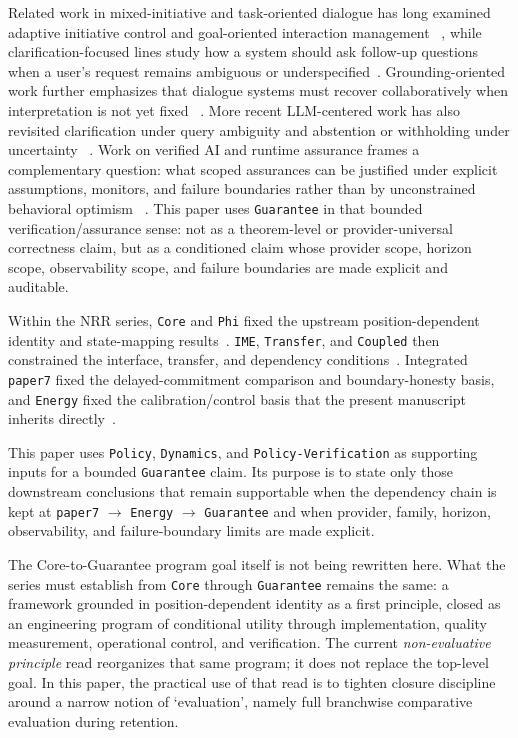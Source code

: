 \documentclass[11pt]{article}
\renewcommand{\_}{\textunderscore\hspace{0pt}}
\begin{document}
Related work in mixed-initiative and task-oriented dialogue has long examined
adaptive initiative control and goal-oriented interaction management
~\cite{chucarroll2000mimic,wen2017taskdialogue}, while clarification-focused lines
study how a system should ask follow-up questions when a user's request remains
ambiguous or underspecified~\cite{deboni2003clarification,rao2018evpi,hu2020interactive}. Grounding-oriented work further emphasizes that dialogue systems
must recover collaboratively when interpretation is not yet fixed
~\cite{benotti2021groundedclarifications,benotti2021grounding}. More recent
LLM-centered work has also revisited clarification under query ambiguity and
abstention or withholding under uncertainty
~\cite{sahay-etal-2025-ask,wen-etal-2025-know,madhusudhan-etal-2025-llms}.
Work on verified AI and runtime assurance frames a complementary question:
what scoped assurances can be justified under explicit assumptions, monitors,
and failure boundaries rather than by unconstrained behavioral optimism
~\cite{seshia2022verifiedai,desai2019soter}. This paper uses
\texttt{Guarantee} in that bounded verification/assurance sense: not as a
theorem-level or provider-universal correctness claim, but as a conditioned
claim whose provider scope, horizon scope, observability scope, and failure
boundaries are made explicit and auditable.

Within the NRR series, \texttt{Core} and \texttt{Phi} fixed the upstream
position-dependent identity and state-mapping results~\cite{saito2025nrr,saito2026phi}.
\texttt{IME}, \texttt{Transfer}, and \texttt{Coupled} then constrained the
interface, transfer, and dependency conditions~\cite{saito2026ime,saito2026transfer,saito2026coupled}.
Integrated \texttt{paper7} fixed the delayed-commitment comparison and
boundary-honesty basis, and \texttt{Energy} fixed the calibration/control basis
that the present manuscript inherits directly~\cite{saito2026principles,saito2026energy}.

This paper uses \texttt{Policy}, \texttt{Dynamics}, and
\texttt{Policy-Verification} as supporting inputs for a bounded
\texttt{Guarantee} claim. Its purpose is to state only those downstream
conclusions that remain supportable when the dependency chain is kept at
\texttt{paper7} $\rightarrow$ \texttt{Energy} $\rightarrow$ \texttt{Guarantee}
and when provider, family, horizon, observability, and failure-boundary limits
are made explicit.

The Core-to-Guarantee program goal itself is not being rewritten here. What the
series must establish from \texttt{Core} through \texttt{Guarantee} remains the
same: a framework grounded in position-dependent identity as a first principle,
closed as an engineering program of conditional utility through
implementation, quality measurement, operational control, and verification. The
current \textit{non-evaluative principle} read reorganizes that same program; it
does not replace the top-level goal. In this paper, the practical use of
that read is to tighten closure discipline around a narrow notion of
`evaluation', namely full branchwise comparative evaluation during retention.
\end{document}
